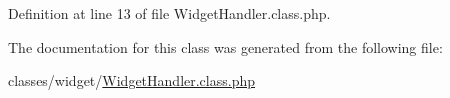 Definition at line 13 of file Widget\-Handler.\-class.\-php.



The documentation for this class was generated from the following file\-:\begin{DoxyCompactItemize}
\item 
classes/widget/\hyperlink{WidgetHandler_8class_8php}{Widget\-Handler.\-class.\-php}\end{DoxyCompactItemize}
